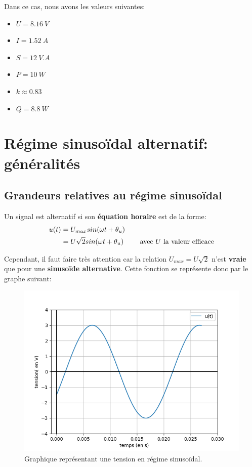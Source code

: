 \documentclass[12pt,a4paper,openany]{book}
\begin{document}
Dans ce cas, nous avons les valeurs suivantes:
\begin{itemize}
\item $ U = 8.16~V $
\item $ I = 1.52~A $
\item $ S = 12~V.A $
\item $ P = 10~W $
\item $ k \approx 0.83 $
\item $ Q = 8.8~W $
\end{itemize}

\chapter{Régime sinusoïdal alternatif: généralités}

\section{Grandeurs relatives au régime sinusoïdal}

Un signal est alternatif si son \textbf{équation horaire} est de la forme:
\begin{align}
u(t) & = U_{max}sin(\omega t + \theta_{u})\\
	 & = U\sqrt{2}sin(\omega t + \theta_{u}) \text{\hspace{20px} avec $ U $ la valeur efficace}
\end{align}

Cependant, il faut faire très attention car la relation $ U_{max} = U\sqrt{2} $ n'est \textbf{vraie} que pour une \textbf{sinusoïde alternative}. Cette fonction se représente donc par le graphe suivant:
\begin{figure}[!h]
\begin{center}
\includegraphics[scale=0.8]{Images/representationSinusoideGeneralites.png} 
\caption{Graphique représentant une tension en régime sinusoïdal.}
\label{representationSinusoideGeneralites}
\end{center}
\end{figure}
\end{document}
